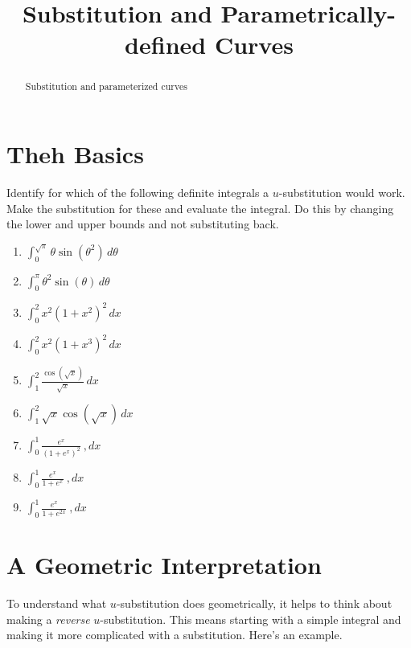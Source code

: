 \documentclass{ximera}
\title{Substitution and Parametrically-defined Curves}
\begin{document}
\begin{abstract}
Substitution and parameterized curves
\end{abstract}
\maketitle

\section{Theh Basics}

\begin{question}\label{Q7yyweff}
Identify for which of the following definite integrals a $u$-substitution would work. Make the substitution for these and evaluate the integral. Do this by changing the lower and upper bounds and not substituting back.

\begin{enumerate}

\item $\int_0^{\sqrt{\pi}} \theta \sin(\theta^2)\, d\theta$

\item $\int_0^{\pi} \theta^2 \sin(\theta)\, d\theta$

\item $\int_0^2 x^2 (1+x^2)^2 \, dx$

\item $\int_0^2 x^2 (1+x^3)^2 \, dx$

\item $\int_1^2 \frac{\cos \left( \sqrt{x} \right)}{\sqrt{x}}\, dx$

\item $\int_1^2 \sqrt{x} \cos \left( \sqrt{x} \right)\, dx$

\item $\int_0^1 \frac{e^x}{(1+e^x)^2} \ , dx$

\item $\int_0^1 \frac{e^x}{1+e^x} \ , dx$

\item $\int_0^1 \frac{e^x}{1+e^{2x}} \ , dx$


\end{enumerate}

\end{question}


\section{A Geometric Interpretation}
To understand what $u$-substitution does geometrically, it helps to think about making a \emph{reverse} $u$-substitution. This means starting with a simple integral and making it more complicated with a substitution. Here's an example.
\end{document}
